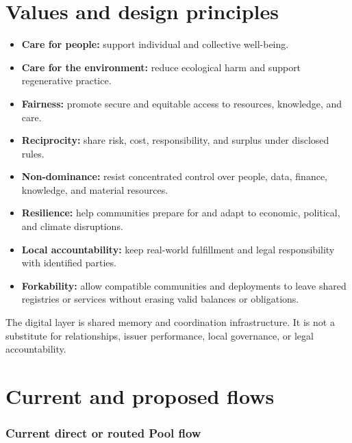 \documentclass[11pt]{article}
\begin{document}
\section*{Values and design principles}

\begin{itemize}[leftmargin=*]
\item \textbf{Care for people:} support individual and collective well-being.
\item \textbf{Care for the environment:} reduce ecological harm and support regenerative practice.
\item \textbf{Fairness:} promote secure and equitable access to resources, knowledge, and care.
\item \textbf{Reciprocity:} share risk, cost, responsibility, and surplus under disclosed rules.
\item \textbf{Non-dominance:} resist concentrated control over people, data, finance, knowledge, and material resources.
\item \textbf{Resilience:} help communities prepare for and adapt to economic, political, and climate disruptions.
\item \textbf{Local accountability:} keep real-world fulfillment and legal responsibility with identified parties.
\item \textbf{Forkability:} allow compatible communities and deployments to leave shared registries or services without erasing valid balances or obligations.
\end{itemize}
The digital layer is shared memory and coordination infrastructure. It is not a substitute for relationships, issuer performance, local governance, or legal accountability.

\section*{Current and proposed flows}

\subsubsection*{Current direct or routed Pool flow}
\end{document}
